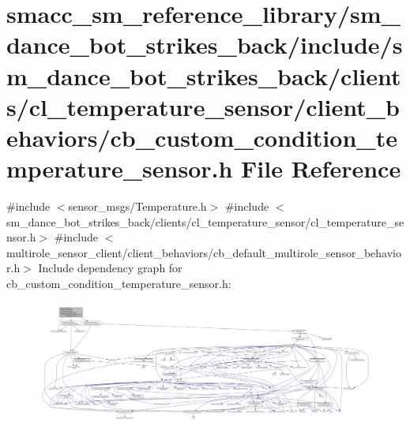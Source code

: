 \hypertarget{sm__dance__bot__strikes__back_2include_2sm__dance__bot__strikes__back_2clients_2cl__temperature_ecc9ed7c5818f2b7812bf2e5c3b93ea7}{}\section{smacc\+\_\+sm\+\_\+reference\+\_\+library/sm\+\_\+dance\+\_\+bot\+\_\+strikes\+\_\+back/include/sm\+\_\+dance\+\_\+bot\+\_\+strikes\+\_\+back/clients/cl\+\_\+temperature\+\_\+sensor/client\+\_\+behaviors/cb\+\_\+custom\+\_\+condition\+\_\+temperature\+\_\+sensor.h File Reference}
\label{sm__dance__bot__strikes__back_2include_2sm__dance__bot__strikes__back_2clients_2cl__temperature_ecc9ed7c5818f2b7812bf2e5c3b93ea7}
{\ttfamily \#include $<$sensor\+\_\+msgs/\+Temperature.\+h$>$}\newline
{\ttfamily \#include $<$sm\+\_\+dance\+\_\+bot\+\_\+strikes\+\_\+back/clients/cl\+\_\+temperature\+\_\+sensor/cl\+\_\+temperature\+\_\+sensor.\+h$>$}\newline
{\ttfamily \#include $<$multirole\+\_\+sensor\+\_\+client/client\+\_\+behaviors/cb\+\_\+default\+\_\+multirole\+\_\+sensor\+\_\+behavior.\+h$>$}\newline
Include dependency graph for cb\+\_\+custom\+\_\+condition\+\_\+temperature\+\_\+sensor.\+h\+:
\nopagebreak
\begin{figure}[H]
\begin{center}
\leavevmode
\includegraphics[width=350pt]{sm__dance__bot__strikes__back_2include_2sm__dance__bot__strikes__back_2clients_2cl__temperature_256a76fea3bf910891d4556f2310e74b}
\end{center}
\end{figure}
